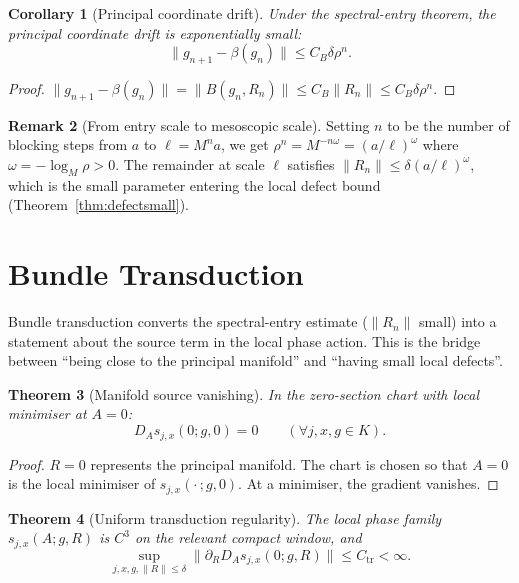 \documentclass[12pt]{article}
\theoremstyle{plain}
\newtheorem{theorem}{Theorem}[section]
\newtheorem{corollary}[theorem]{Corollary}
\theoremstyle{definition}
\newtheorem{remark}[theorem]{Remark}
\numberwithin{equation}{section}
\newcommand{\tr}{\mathrm{tr}}
\begin{document}
\begin{corollary}[Principal coordinate drift]\label{cor:drift}
Under the spectral-entry theorem, the principal coordinate drift is exponentially small:
\begin{equation}
\|g_{n+1}-\beta(g_n)\| \leq C_B\delta\rho^n.
\end{equation}
\end{corollary}

\begin{proof}
$\|g_{n+1}-\beta(g_n)\|=\|B(g_n,R_n)\|\leq C_B\|R_n\|\leq C_B\delta\rho^n$.
\end{proof}

\begin{remark}[From entry scale to mesoscopic scale]
Setting $n$ to be the number of blocking steps from $a$ to $\ell=M^n a$, we get $\rho^n=M^{-n\omega}=(a/\ell)^\omega$ where $\omega=-\log_M\rho>0$.  The remainder at scale $\ell$ satisfies $\|R_n\|\leq\delta(a/\ell)^\omega$, which is the small parameter entering the local defect bound (Theorem~\ref{thm:defectsmall}).
\end{remark}

\section{Bundle Transduction}\label{sec:transduction}

Bundle transduction converts the spectral-entry estimate ($\|R_n\|$ small) into a statement about the source term in the local phase action.  This is the bridge between ``being close to the principal manifold'' and ``having small local defects''.

\begin{theorem}[Manifold source vanishing]\label{thm:sourcevanishing}
In the zero-section chart with local minimiser at $A=0$:
\begin{equation}
D_A s_{j,x}(0;g,0) = 0\qquad(\forall j,x,g\in K).
\end{equation}
\end{theorem}

\begin{proof}
$R=0$ represents the principal manifold.  The chart is chosen so that $A=0$ is the local minimiser of $s_{j,x}(\cdot\,;g,0)$.  At a minimiser, the gradient vanishes.
\end{proof}

\begin{theorem}[Uniform transduction regularity]\label{thm:regularity}
The local phase family $s_{j,x}(A;g,R)$ is $C^3$ on the relevant compact window, and
\begin{equation}
\sup_{j,x,g,\|R\|\leq\delta}\|\partial_{R}D_A s_{j,x}(0;g,R)\| \leq C_{\tr} < \infty.
\end{equation}
\end{theorem}
\end{document}
